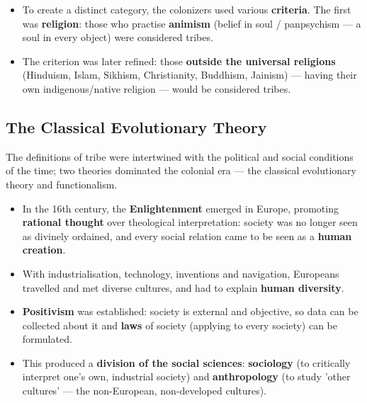\begin{itemize}
\item To create a distinct category, the colonizers used various \textbf{criteria}. The first was \textbf{religion}: those who practise \textbf{animism} (belief in soul / panpsychism --- a soul in every object) were considered tribes.
\item The criterion was later refined: those \textbf{outside the universal religions} (Hinduism, Islam, Sikhism, Christianity, Buddhism, Jainism) --- having their own indigenous/native religion --- would be considered tribes.
\end{itemize}

\subsection{The Classical Evolutionary Theory}

The definitions of tribe were intertwined with the political and social conditions of the time; two theories dominated the colonial era --- the classical evolutionary theory and functionalism.

\begin{KeyConcept}
\begin{itemize}
\item In the 16th century, the \textbf{Enlightenment} emerged in Europe, promoting \textbf{rational thought} over theological interpretation: society was no longer seen as divinely ordained, and every social relation came to be seen as a \textbf{human creation}.
\item With industrialisation, technology, inventions and navigation, Europeans travelled and met diverse cultures, and had to explain \textbf{human diversity}.
\item \textbf{Positivism} was established: society is external and objective, so data can be collected about it and \textbf{laws} of society (applying to every society) can be formulated.
\item This produced a \textbf{division of the social sciences}: \textbf{sociology} (to critically interpret one's own, industrial society) and \textbf{anthropology} (to study 'other cultures' --- the non-European, non-developed cultures).
\end{itemize}
\end{KeyConcept}


